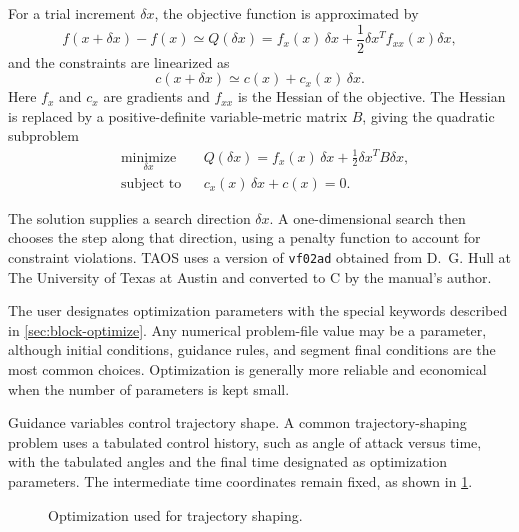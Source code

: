 For a trial increment $\delta x$, the objective function is approximated by
\begin{equation}
  f(x+\delta x)-f(x)
  \simeq Q(\delta x)
  =f_x(x)\,\delta x
   +\frac{1}{2}\delta x^{T}f_{xx}(x)\delta x,
  \label{eq:optimization-quadratic-approximation}
\end{equation}
and the constraints are linearized as
\begin{equation}
  c(x+\delta x)
  \simeq c(x)+c_x(x)\,\delta x.
  \label{eq:optimization-constraint-linearization}
\end{equation}
Here $f_x$ and $c_x$ are gradients and $f_{xx}$ is the Hessian of the objective.
The Hessian is replaced by a positive-definite variable-metric matrix $B$, giving the
quadratic subproblem
\begin{equation}
\begin{aligned}
  &\underset{\delta x}{\operatorname{minimize}}
  && Q(\delta x)
     =f_x(x)\,\delta x
      +\frac{1}{2}\delta x^{T}B\delta x,\\
  &\text{subject to}
  && c_x(x)\,\delta x+c(x)=0.
\end{aligned}
\label{eq:optimization-quadratic-subproblem}
\end{equation}

The solution supplies a search direction $\delta x$. A one-dimensional search then
chooses the step along that direction, using a penalty function to account for
constraint violations. TAOS uses a version of \texttt{vf02ad} obtained from
D.~G. Hull at The University of Texas at Austin and converted to C by the manual's
author.


The user designates optimization parameters with the special keywords described in
\cref{sec:block-optimize}. Any numerical problem-file value may be a parameter,
although initial conditions, guidance rules, and segment final conditions are the
most common choices. Optimization is generally more reliable and economical when
the number of parameters is kept small.

Guidance variables control trajectory shape. A common trajectory-shaping problem
uses a tabulated control history, such as angle of attack versus time, with the tabulated
angles and the final time designated as optimization parameters. The intermediate
time coordinates remain fixed, as shown in
\cref{fig:trajectory-shaping-optimization}.

\begin{figure}[htbp]
  \centering
  
  \caption{Optimization used for trajectory shaping.}
  \label{fig:trajectory-shaping-optimization}
\end{figure}

